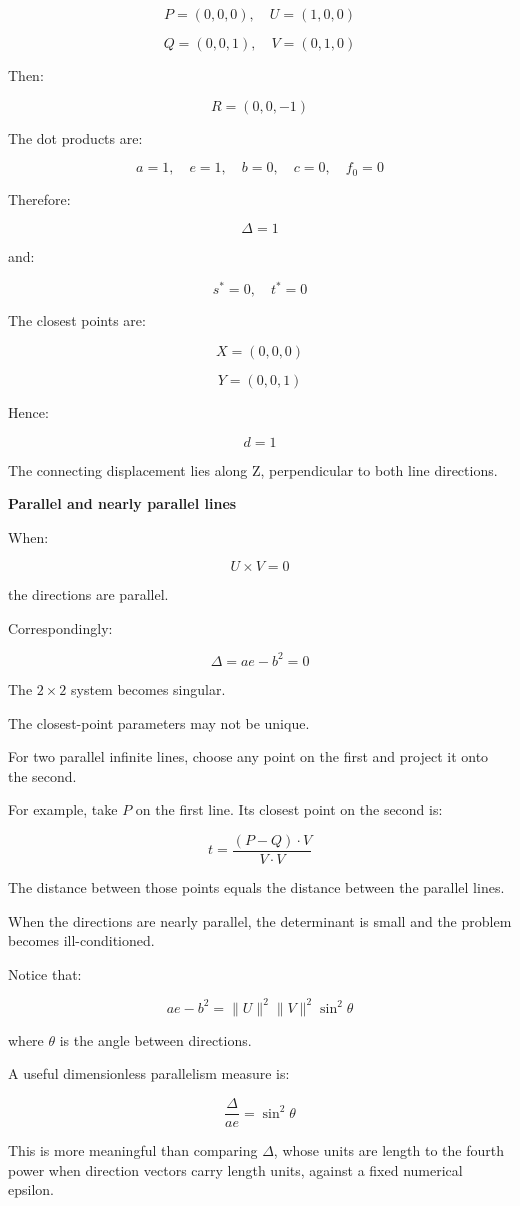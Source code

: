 \[
P=(0,0,0),\quad U=(1,0,0)
\]

\[
Q=(0,0,1),\quad V=(0,1,0)
\]

Then:

\[
R=(0,0,-1)
\]

The dot products are:

\[
a=1,\quad e=1,\quad b=0,\quad c=0,\quad f_0=0
\]

Therefore:

\[
\Delta=1
\]

and:

\[
s^*=0,\quad t^*=0
\]

The closest points are:

\[
X=(0,0,0)
\]

\[
Y=(0,0,1)
\]

Hence:

\[
\boxed{d=1}
\]

The connecting displacement lies along Z, perpendicular to both line directions.

\textbf{Parallel and nearly parallel lines}

When:

\[
U\times V=0
\]

the directions are parallel.

Correspondingly:

\[
\Delta=ae-b^2=0
\]

The \(2\times2\) system becomes singular.

The closest-point parameters may not be unique.

For two parallel infinite lines, choose any point on the first and project it onto the second.

For example, take \(P\) on the first line. Its closest point on the second is:

\[
t=\frac{(P-Q)\cdot V}{V\cdot V}
\]

The distance between those points equals the distance between the parallel lines.

When the directions are nearly parallel, the determinant is small and the problem becomes ill-conditioned.

Notice that:

\[
ae-b^2 = \|U\|^2\|V\|^2\sin^2\theta
\]

where \(\theta\) is the angle between directions.

A useful dimensionless parallelism measure is:

\[
\boxed{ \frac{\Delta}{ae}=\sin^2\theta }
\]

This is more meaningful than comparing \(\Delta\), whose units are length to the fourth power when direction vectors carry length units, against a fixed numerical epsilon.

